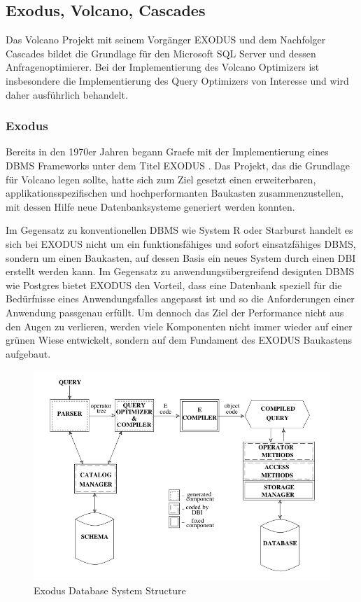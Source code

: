 \subsection{Exodus, Volcano, Cascades}

Das Volcano Projekt mit seinem Vorgänger \ac{EXODUS} und dem Nachfolger Cascades bildet die Grundlage für den Microsoft SQL Server und dessen Anfragenoptimierer. Bei der Implementierung des Volcano Optimizers ist insbesondere die Implementierung des Query Optimizers von Interesse und wird daher ausführlich behandelt.

\subsubsection{Exodus}


Bereits in den 1970er Jahren begann Graefe mit der Implementierung eines DBMS Frameworks unter dem Titel EXODUS \cite{carey1990exodus} . Das Projekt, das die Grundlage für Volcano legen sollte, hatte sich zum Ziel gesetzt einen erweiterbaren, applikationsspezifischen und hochperformanten Baukasten zusammenzustellen, mit dessen Hilfe neue Datenbanksysteme generiert werden konnten. 

Im Gegensatz zu konventionellen DBMS wie System R oder Starburst handelt es sich bei EXODUS nicht um ein funktionsfähiges und sofort einsatzfähiges DBMS, sondern um einen Baukasten, auf dessen Basis ein neues System durch einen \ac{DBI} erstellt werden kann. Im Gegensatz zu anwendungsübergreifend designten DBMS wie Postgres bietet EXODUS den Vorteil, dass eine Datenbank speziell für die Bedürfnisse eines Anwendungsfalles angepasst ist und so die Anforderungen einer Anwendung passgenau erfüllt. Um dennoch das Ziel der Performance nicht aus den Augen zu verlieren, werden viele Komponenten nicht immer wieder auf einer grünen Wiese entwickelt, sondern auf dem Fundament des EXODUS Baukastens aufgebaut.

\begin{figure}[ht]
  \centering
  \includegraphics[width=\textwidth]{02_Grundlagen/ExodusDatabaseSystemStructure.png}
  \caption{Exodus Database System Structure}
  \label{ExodusDatabaseStructure}
\end{figure}

